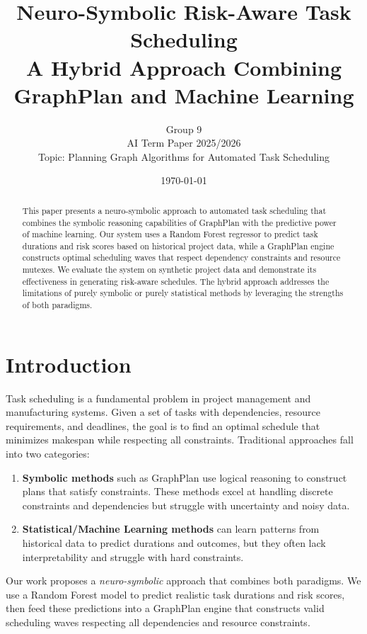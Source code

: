\documentclass[11pt,a4paper]{article}
\title{\textbf{Neuro-Symbolic Risk-Aware Task Scheduling}\\
\large A Hybrid Approach Combining GraphPlan and Machine Learning}
\author{
    Group 9 \\
    AI Term Paper 2025/2026 \\
    Topic: Planning Graph Algorithms for Automated Task Scheduling
}
\date{\today}
\begin{document}
\maketitle

\begin{abstract}
This paper presents a neuro-symbolic approach to automated task scheduling that combines the symbolic reasoning capabilities of GraphPlan with the predictive power of machine learning. Our system uses a Random Forest regressor to predict task durations and risk scores based on historical project data, while a GraphPlan engine constructs optimal scheduling waves that respect dependency constraints and resource mutexes. We evaluate the system on synthetic project data and demonstrate its effectiveness in generating risk-aware schedules. The hybrid approach addresses the limitations of purely symbolic or purely statistical methods by leveraging the strengths of both paradigms.
\end{abstract}

\section{Introduction}
\label{sec:introduction}

Task scheduling is a fundamental problem in project management and manufacturing systems. Given a set of tasks with dependencies, resource requirements, and deadlines, the goal is to find an optimal schedule that minimizes makespan while respecting all constraints. Traditional approaches fall into two categories:

\begin{enumerate}
    \item \textbf{Symbolic methods} such as GraphPlan \cite{blum1997fast} use logical reasoning to construct plans that satisfy constraints. These methods excel at handling discrete constraints and dependencies but struggle with uncertainty and noisy data.
    
    \item \textbf{Statistical/Machine Learning methods} can learn patterns from historical data to predict durations and outcomes, but they often lack interpretability and struggle with hard constraints.
\end{enumerate}

Our work proposes a \textit{neuro-symbolic} approach that combines both paradigms. We use a Random Forest model \cite{breiman2001random} to predict realistic task durations and risk scores, then feed these predictions into a GraphPlan engine that constructs valid scheduling waves respecting all dependencies and resource constraints.
\end{document}

